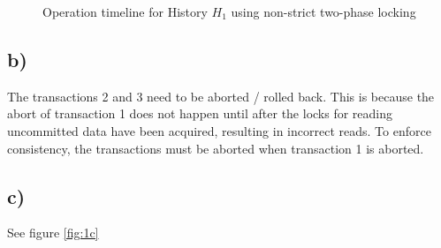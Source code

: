 \documentclass{scrartcl}
\begin{document}
\begin{figure}[!ht]
	\caption{Operation timeline for History \(H_1\) using non-strict two-phase locking}
	\label{fig:1a}
\end{figure}

\subsection*{b)}

The transactions 2 and 3 need to be aborted / rolled back.
This is because the abort of transaction 1 does not happen until after the locks for reading uncommitted data have been acquired, resulting in incorrect reads.
To enforce consistency, the transactions must be aborted when transaction 1 is aborted.

\subsection*{c)}

See figure \ref{fig:1c}
\end{document}
